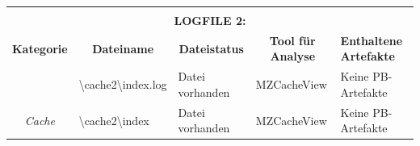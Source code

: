 \begin{appendices}
{\begin{landscape}
\begin{table}[h!]
{\begin{tabular}{cllll}
	\multicolumn{1}{l}{}                                                                                         &                                                                                                                                                                                                                     &                                                                                                   &                                                  &                                                                 \\
	\multicolumn{5}{c}{\textbf{LOGFILE 2:}}                                                                                                                                                                                                                                                                                                                                                                                                                                                                                                                     \\ \hline
	\multicolumn{1}{|c|}{\textbf{Kategorie}}                                                                     & \multicolumn{1}{c|}{\textbf{Dateiname}}                                                                                                                                                                             & \multicolumn{1}{c|}{\textbf{Dateistatus}}                                                         & \multicolumn{1}{c|}{\textbf{Tool für Analyse}}   & \multicolumn{1}{l|}{\textbf{Enthaltene Artefakte}}              \\ \hline
	\multicolumn{1}{|c|}{}                                                                                       & \multicolumn{1}{l|}{\cellcolor[HTML]{34CDF9}\textbackslash{}cache2\textbackslash{}index.log}                                                                                                                        & \multicolumn{1}{l|}{\cellcolor[HTML]{009901}Datei vorhanden}                                      & \multicolumn{1}{l|}{MZCacheView}            & \multicolumn{1}{l|}{\cellcolor[HTML]{F8A102}Keine PB-Artefakte} \\ \cline{2-5} 
	\multicolumn{1}{|c|}{\multirow{-2}{*}{\textit{Cache}}}                                                       & \multicolumn{1}{l|}{\cellcolor[HTML]{34CDF9}\textbackslash{}cache2\textbackslash{}index}                                                                                                                            & \multicolumn{1}{l|}{\cellcolor[HTML]{009901}Datei vorhanden}                                      & \multicolumn{1}{l|}{MZCacheView}            & \multicolumn{1}{l|}{\cellcolor[HTML]{F8A102}Keine PB-Artefakte} \\ \hline

\end{tabular}}
\end{table}
\end{landscape}}
\end{appendices}
